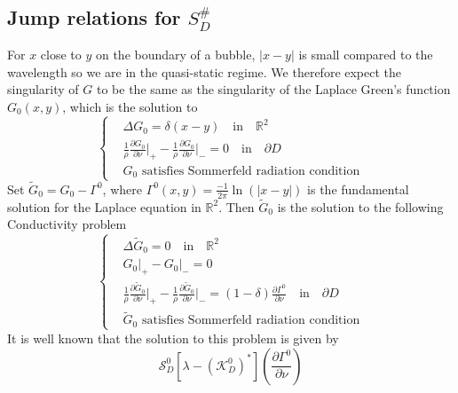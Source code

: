 \documentclass[a4paper]{article}
\theoremstyle{definition}
\newcommand{\R}{\mathbb{R}}
\newcommand{\ds}{\displaystyle}
\begin{document}
\subsection{Jump relations for $S_D^\#$}
For $x$ close to $y$ on the boundary of a bubble, $|x-y|$ is small compared to the wavelength so we are in the quasi-static regime. We therefore expect the singularity of $G$ to be the same as the singularity of the Laplace Green's function $G_0(x,y)$, which is the solution to 
\begin{equation*}
\left\{
\begin{array}{ll}
	&\ds \Delta G_0 = \delta(x-y) \quad \text{in}\quad \R^2 \\
	&\ds \frac{1}{\rho}\frac{\partial G_0}{\partial \nu}\bigg|_+ - \frac{1}{\rho}\frac{\partial G_0}{\partial \nu}\bigg|_- = 0 \quad \text{in} \quad \partial D \\
	&\ds G_0 \text{ satisfies Sommerfeld radiation condition} 
\end{array}
\right.	
\end{equation*}
Set $\tilde{G}_0 = G_0-\Gamma^0$, where $\Gamma^0(x,y)= \frac{-1}{2\pi}\ln(|x-y|)$ is the fundamental solution for the Laplace equation in $\R^2$. Then $\tilde{G}_0$ is the solution to the following Conductivity problem
\begin{equation*}
\left\{
\begin{array}{ll}
&\ds \Delta \tilde{G}_0 = 0 \quad \text{in}\quad \R^2 \\
&\ds G_0\big|_+-G_0\big|_- = 0 \\
&\ds \frac{1}{\rho}\frac{\partial \tilde{G}_0}{\partial \nu}\bigg|_+ - \frac{1}{\rho}\frac{\partial \tilde{G}_0}{\partial \nu}\bigg|_- = (1-\delta)\frac{\partial \Gamma^0}{\partial \nu} \quad \text{in} \quad \partial D \\
&\ds \tilde{G}_0 \text{ satisfies Sommerfeld radiation condition} 
\end{array}
\right.	
\end{equation*}
It is well known that the solution to this problem is given by
\begin{equation*}
\mathcal{S}_D^0 \left[\lambda - \left( \mathcal{K}_D^0 \right)^* \right] \left( \frac{\partial\Gamma^0}{\partial \nu} \right) 
\end{equation*}
\end{document}
